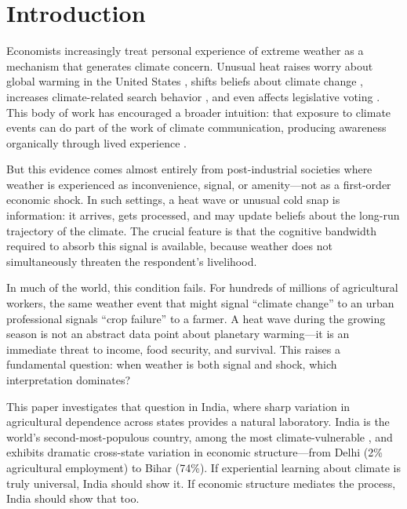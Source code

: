 \documentclass[12pt]{article}
\begin{document}
\section{Introduction}

Economists increasingly treat personal experience of extreme weather as a mechanism that generates climate concern. Unusual heat raises worry about global warming in the United States \citep{eganmullin2012}, shifts beliefs about climate change \citep{deryugina2013}, increases climate-related search behavior \citep{herrnstadt2014}, and even affects legislative voting \citep{hazlett2020}. This body of work has encouraged a broader intuition: that exposure to climate events can do part of the work of climate communication, producing awareness organically through lived experience \citep{weber2006}.

But this evidence comes almost entirely from post-industrial societies where weather is experienced as inconvenience, signal, or amenity---not as a first-order economic shock. In such settings, a heat wave or unusual cold snap is information: it arrives, gets processed, and may update beliefs about the long-run trajectory of the climate. The crucial feature is that the cognitive bandwidth required to absorb this signal is available, because weather does not simultaneously threaten the respondent's livelihood.

In much of the world, this condition fails. For hundreds of millions of agricultural workers, the same weather event that might signal ``climate change'' to an urban professional signals ``crop failure'' to a farmer. A heat wave during the growing season is not an abstract data point about planetary warming---it is an immediate threat to income, food security, and survival. This raises a fundamental question: when weather is both signal and shock, which interpretation dominates?

This paper investigates that question in India, where sharp variation in agricultural dependence across states provides a natural laboratory. India is the world's second-most-populous country, among the most climate-vulnerable \citep{germanwatch2021}, and exhibits dramatic cross-state variation in economic structure---from Delhi (2\% agricultural employment) to Bihar (74\%). If experiential learning about climate is truly universal, India should show it. If economic structure mediates the process, India should show that too.
\end{document}
